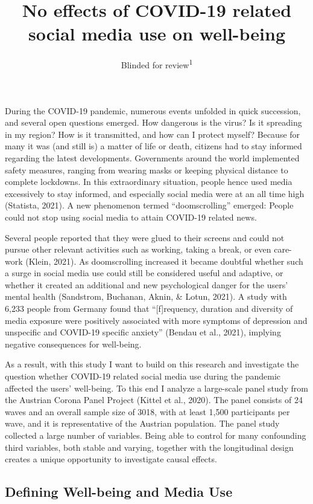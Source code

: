 \documentclass[
  english,
  man,mask,floatsintext]{apa6}
\title{No effects of COVID-19 related social media use on well-being}
\author{Blinded for review\textsuperscript{1}}
\date{}
\affiliation{\vspace{0.5cm}\textsuperscript{1} Blinded for review}
\begin{document}
\maketitle

During the COVID-19 pandemic,
numerous events unfolded in quick succession, and several open questions emerged.
How dangerous is the virus? Is it spreading in my region? How is it transmitted, and how can I protect myself?
Because for many it was (and still is) a matter of life or death, citizens had to stay informed regarding the latest developments.
Governments around the world implemented safety measures, ranging from wearing masks or keeping physical distance to complete lockdowns.
In this extraordinary situation, people hence used media excessively to stay informed, and especially social media were at an all time high (Statista, 2021).
A new phenomenon termed ``doomscrolling'' emerged:
People could not stop using social media to attain COVID-19 related news.

Several people reported that they were glued to their screens and could not pursue other relevant activities such as working, taking a break, or even care-work (Klein, 2021).
As doomscrolling increased it became doubtful whether such a surge in social media use could still be considered useful and adaptive, or whether it created an additional and new psychological danger for the users' mental health (Sandstrom, Buchanan, Aknin, \& Lotun, 2021).
A study with 6,233 people from Germany found that ``{[}f{]}requency, duration and diversity of media exposure were positively associated with more symptoms of depression and unspecific and COVID-19 specific anxiety'' (Bendau et al., 2021), implying negative consequences for well-being.

As a result, with this study I want to build on this research and investigate the question whether COVID-19 related social media use during the pandemic affected the users' well-being.
To this end I analyze a large-scale panel study from the Austrian Corona Panel Project (Kittel et al., 2020).
The panel consists of 24 waves and an overall sample size of 3018, with at least 1,500 participants per wave, and it is representative of the Austrian population.
The panel study collected a large number of variables.
Being able to control for many confounding third variables, both stable and varying, together with the longitudinal design creates a unique opportunity to investigate causal effects.

\hypertarget{defining-well-being-and-media-use}{%
\subsection{Defining Well-being and Media Use}\label{defining-well-being-and-media-use}}
\end{document}
